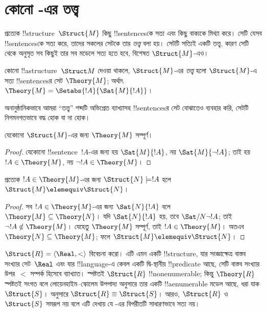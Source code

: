 \documentclass[../../../include/open-logic-section]{subfiles}
\begin{document}

\section{কোনো -এর তত্ত্ব}

প্রত্যেক !!{structure}~$\Struct{M}$ কিছু !!{sentence}sকে সত্য এবং
কিছু বাক্যকে মিথ্যা করে। সেটি যেসব !!{sentence}sকে সত্য করে, তাদের
সকলের সেটকে তার \emph{তত্ত্ব} বলা হয়। সেটটি সত্যিই একটি তত্ত্ব, কারণ
সেটি থেকে অনুসৃত সব কিছুই তার সব মডেলে সত্য হতে হবে, বিশেষত
$\Struct{M}$-এও।

\begin{defn}
  কোনো !!a{structure}~$\Struct M$ দেওয়া থাকলে, $\Struct{M}$-এর
  \emph{তত্ত্ব} হলো $\Struct{M}$-এ সত্য !!{sentence}sর সেট
  $\Theory{M}$; অর্থাৎ $\Theory{M} = \Setabs{!A}{\Sat{M}{!A}}$।
\end{defn}

অনানুষ্ঠানিকভাবে আমরা “তত্ত্ব” শব্দটি অভিপ্রেত ব্যাখ্যাসহ
!!{sentence}sর সেট বোঝাতেও ব্যবহার করি, সেটটি নিগমনগতভাবে বদ্ধ হোক
বা না হোক।

\begin{prop}
যেকোনো $\Struct{M}$-এর জন্য $\Theory{M}$ সম্পূর্ণ।
\end{prop}

\begin{proof}
যেকোনো !!{sentence}~$!A$-এর জন্য হয় $\Sat{M}{!A}$, নয়
$\Sat{M}{\lnot !A}$; তাই হয় $!A \in \Theory{M}$, নয়
$\lnot !A \in \Theory{M}$।
\end{proof}

\begin{prop}
  প্রত্যেক $!A \in \Theory{M}$-এর জন্য $\Struct{N} \models !A$ হলে
  $\Struct{M} \elemequiv \Struct{N}$।
\end{prop}

\begin{proof}
সব $!A \in \Theory{M}$-এর জন্য $\Sat{N}{!A}$ বলে $\Theory{M}
\subseteq \Theory{N}$। যদি $\Sat{N}{!A}$ হয়, তবে
$\Sat/{N}{\lnot !A}$; তাই $\lnot !A \notin \Theory{M}$। যেহেতু
$\Theory{M}$ সম্পূর্ণ, তাই $!A \in \Theory{M}$। অতএব $\Theory{N}
\subseteq \Theory{M}$; ফলে $\Struct{M} \elemequiv \Struct{N}$।
\end{proof}

\begin{rem}
  $\Struct{R} = \langle\Real, <\rangle$ বিবেচনা করো। এটি এমন একটি
  !!{structure}, যার সংজ্ঞাক্ষেত্র বাস্তব সংখ্যার সেট~$\Real$ এবং যার
  !!{language}-এ কেবল একটি দ্বি-স্থানীয় !!{predicate} আছে, সেটি বাস্তব
  সংখ্যার উপর~$<$ সম্পর্ক হিসেবে ব্যাখ্যাত। স্পষ্টতই $\Struct{R}$
  !!{nonenumerable}; কিন্তু $\Theory{R}$ স্পষ্টতই সংগত বলে
  লোয়েনহাইম--স্কোলেম উপপাদ্য অনুসারে তার একটি !!a{enumerable} মডেল
  আছে, ধরা যাক $\Struct{S}$।  অনুসারে
  $\Struct{R} \equiv \Struct{S}$। আরও, $\Struct{R}$ ও~$\Struct{S}$
  সমরূপ নয় বলে এটি দেখায় যে -এর বিপরীতটি
  সাধারণভাবে সত্য নয়।
\end{rem}
\end{document}
